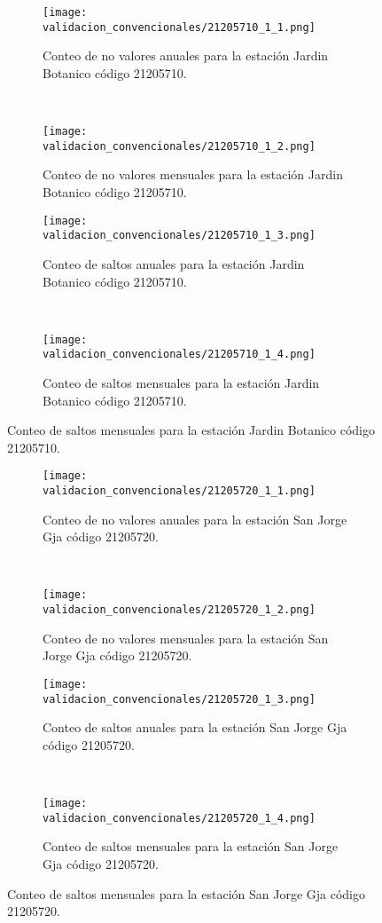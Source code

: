 \begin{figure}[H]\ContinuedFloat
\centering
	\begin{subfigure}[normla]{0.4\textwidth}
	\texttt{[image: validacion\_convencionales/21205710\_1\_1.png]}
		\caption{Conteo de no valores anuales para la estación Jardin Botanico código 21205710.}
		\label{subfig:a1}
		\end{subfigure}
		~
    \begin{subfigure}[normla]{0.4\textwidth}
	\texttt{[image: validacion\_convencionales/21205710\_1\_2.png]}
		\caption{Conteo de no valores mensuales para la estación Jardin Botanico código 21205710.}
		\label{subfig:a2}
		\end{subfigure}
		
    \begin{subfigure}[normla]{0.4\textwidth}
	\texttt{[image: validacion\_convencionales/21205710\_1\_3.png]}
		\caption{Conteo de saltos anuales para la estación Jardin Botanico código 21205710.}
		\label{subfig:a1}
		\end{subfigure}
		~
    \begin{subfigure}[normla]{0.4\textwidth}
	\texttt{[image: validacion\_convencionales/21205710\_1\_4.png]}
		\caption{Conteo de saltos mensuales para la estación Jardin Botanico código 21205710.}
		\label{subfig:a2}
		\end{subfigure}

	
\end{figure}
           
\begin{figure}[H]\ContinuedFloat
\centering
	\begin{subfigure}[normla]{0.4\textwidth}
	\texttt{[image: validacion\_convencionales/21205720\_1\_1.png]}
		\caption{Conteo de no valores anuales para la estación San Jorge Gja código 21205720.}
		\label{subfig:a1}
		\end{subfigure}
		~
    \begin{subfigure}[normla]{0.4\textwidth}
	\texttt{[image: validacion\_convencionales/21205720\_1\_2.png]}
		\caption{Conteo de no valores mensuales para la estación San Jorge Gja código 21205720.}
		\label{subfig:a2}
		\end{subfigure}
		
    \begin{subfigure}[normla]{0.4\textwidth}
	\texttt{[image: validacion\_convencionales/21205720\_1\_3.png]}
		\caption{Conteo de saltos anuales para la estación San Jorge Gja código 21205720.}
		\label{subfig:a1}
		\end{subfigure}
		~
    \begin{subfigure}[normla]{0.4\textwidth}
	\texttt{[image: validacion\_convencionales/21205720\_1\_4.png]}
		\caption{Conteo de saltos mensuales para la estación San Jorge Gja código 21205720.}
		\label{subfig:a2}
		\end{subfigure}

	
\end{figure}
           
